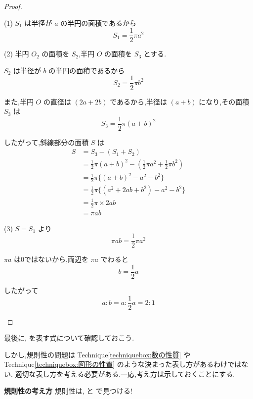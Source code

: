 \begin{proof}\mbox{}\\
  \begin{hiddenanswer}
  (1) $S_1$ は半径が $a$ の半円の面積であるから
  \[S_1 = \frac{1}{2}\pi a^2\]

  (2) 半円 $O_2$ の面積を $S_2$,半円 $O$ の面積を $S_3$ とする.

  $S_2$ は半径が $b$ の半円の面積であるから
  \[S_2 = \frac{1}{2}\pi b^2\]

  また,半円 $O$ の直径は $(2a + 2b)$ であるから,半径は $(a + b)$ になり,その面積 $S_3$ は
  \[S_3 = \frac{1}{2}\pi(a + b)^2\]

  したがって,斜線部分の面積 $S$ は
  \begin{align*}
  S &= S_3 - (S_1 + S_2) \\
  &= \frac{1}{2}\pi(a + b)^2 - \left(\frac{1}{2}\pi a^2 + \frac{1}{2}\pi b^2\right) \\
  &= \frac{1}{2}\pi\{(a + b)^2 - a^2 - b^2\} \\
  &= \frac{1}{2}\pi\{(a^2 + 2ab + b^2) - a^2 - b^2\} \\
  &= \frac{1}{2}\pi \times 2ab \\
  &= \pi ab
  \end{align*}

  (3) $S = S_1$ より
  \[\pi ab = \frac{1}{2}\pi a^2\]

  $\pi a$ は0ではないから,両辺を $\pi a$ でわると
  \[b = \frac{1}{2}a\]

  したがって
  \[a : b = a : \frac{1}{2}a = 2 : 1\]
  \end{hiddenanswer}
\end{proof}

\newpage

最後に,\fitblankbf[規則性]{} を表す式について確認しておこう.

しかし,規則性の問題は Technique\ref{techniquebox:数の性質} や Technique\ref{techniquebox:図形の性質} のような決まった表し方があるわけではない.
適切な表し方を考える必要がある.一応,考え方は示しておくことにする.

\begin{techniquebox}{\textbf{規則性の考え方}}
  \label{techniquebox:規則性の考え方}
  規則性は,\fitblankbf[仮説]{} と \fitblankbf[検証]{} で見つける!
\end{techniquebox}

